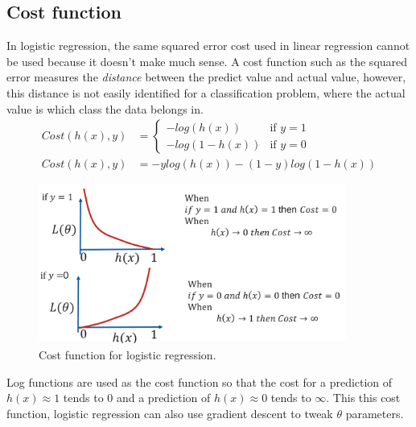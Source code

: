 \documentclass[CS5104-Notes.tex]{subfiles}
\begin{document}
\subsection{Cost function}
In logistic regression, the same squared error cost used in linear regression cannot be used because it doesn't make much sense. A cost function such as the squared error measures the \textit{distance} between the predict value and actual value, however, this distance is not easily identified for a classification problem, where the actual value is which class the data belongs in. 
\begin{align}
Cost(h(x),y) &= \begin{cases}
	-log(h(x)) & \text{if } y = 1 \\
	-log(1-h(x)) & \text{if } y = 0
      \end{cases} \\
Cost(h(x),y) &= -ylog(h(x)) - (1 - y)log(1 - h(x))
\end{align}
\begin{figure}[H]
\centering
\includegraphics[width=0.9\textwidth, keepaspectratio]{imgs/logistic-regression-cost.png}
\caption{Cost function for logistic regression.}
\end{figure}
\noindent
Log functions are used as the cost function so that the cost for a prediction of $h(x) \approx 1$ tends to 0 and a prediction of $h(x) \approx 0$ tends to $\infty$. This this cost function, logistic regression can also use gradient descent to tweak $\theta$ parameters.
\end{document}
